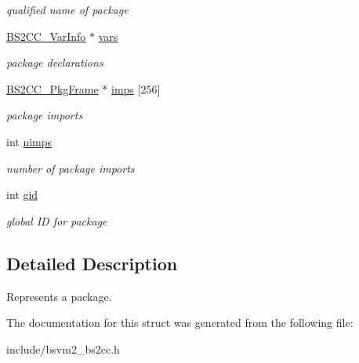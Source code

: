 \begin{DoxyCompactItemize}
\begin{DoxyCompactList}\small\item\em qualified name of package \end{DoxyCompactList}\item 
\hypertarget{structBS2CC__PkgFrame__s_a5627936df05f2ddfba05e527327012c9}{\hyperlink{structBS2CC__VarInfo__s}{B\-S2\-C\-C\-\_\-\-Var\-Info} $\ast$ \hyperlink{structBS2CC__PkgFrame__s_a5627936df05f2ddfba05e527327012c9}{vars}}\label{structBS2CC__PkgFrame__s_a5627936df05f2ddfba05e527327012c9}

\begin{DoxyCompactList}\small\item\em package declarations \end{DoxyCompactList}\item 
\hypertarget{structBS2CC__PkgFrame__s_aa36cec84e2d5b369383cf9d822dfb34b}{\hyperlink{structBS2CC__PkgFrame__s}{B\-S2\-C\-C\-\_\-\-Pkg\-Frame} $\ast$ \hyperlink{structBS2CC__PkgFrame__s_aa36cec84e2d5b369383cf9d822dfb34b}{imps} \mbox{[}256\mbox{]}}\label{structBS2CC__PkgFrame__s_aa36cec84e2d5b369383cf9d822dfb34b}

\begin{DoxyCompactList}\small\item\em package imports \end{DoxyCompactList}\item 
\hypertarget{structBS2CC__PkgFrame__s_a4de6064c2a2149aa5a4e1246ea0b89a0}{int \hyperlink{structBS2CC__PkgFrame__s_a4de6064c2a2149aa5a4e1246ea0b89a0}{nimps}}\label{structBS2CC__PkgFrame__s_a4de6064c2a2149aa5a4e1246ea0b89a0}

\begin{DoxyCompactList}\small\item\em number of package imports \end{DoxyCompactList}\item 
\hypertarget{structBS2CC__PkgFrame__s_ac5a929bfeb10284662fccfc92fc79d23}{int \hyperlink{structBS2CC__PkgFrame__s_ac5a929bfeb10284662fccfc92fc79d23}{gid}}\label{structBS2CC__PkgFrame__s_ac5a929bfeb10284662fccfc92fc79d23}

\begin{DoxyCompactList}\small\item\em global I\-D for package \end{DoxyCompactList}\end{DoxyCompactItemize}


\subsection{Detailed Description}
Represents a package. 

The documentation for this struct was generated from the following file\-:\begin{DoxyCompactItemize}
\item 
include/bsvm2\-\_\-bs2cc.\-h\end{DoxyCompactItemize}

